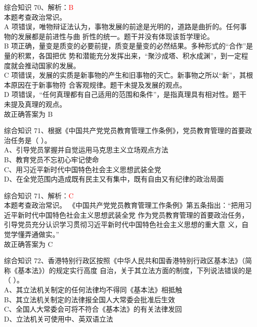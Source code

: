 \documentclass[aspectratio=169]{beamer}
\begin{document}
\begin{frame}[t]{综合知识}
    70、解析：\textcolor{red}{B}\\
    本题考查政治常识。\\
    A 项错误，唯物辩证法认为，事物发展的前途是光明的，道路是曲折的。任何事物的发展都是前进性与曲
    折性的统一。题干并没有体现该哲学理论。\\
    B 项正确，量变是质变的必要前提，质变是量变的必然结果。多种形式的“合作”是量的积累，各国把优
    势和潜能充分发挥出来，“聚沙成塔、积水成渊”，到一定程度就会推动国家的发展。\\
    C 项错误，发展的实质是新事物的产生和旧事物的灭亡。新事物之所以“新”，其根本原因在于新事物符
    合客观规律。题干未提及发展的观点。\\
    D 项错误，“任何真理都有自己适用的范围和条件”，是指真理具有相对性。题干未提及真理的观点。\\
    故正确答案为 B
\end{frame}                           


\begin{frame}[t]{综合知识}
    71、根据《中国共产党党员教育管理工作条例》，党员教育管理的首要政治任务是（ ）。  \\
    A、引导党员掌握并自觉运用马克思主义立场观点方法                                  \\
    B、教育党员不忘初心牢记使命                                                      \\
    C、用习近平新时代中国特色社会主义思想武装全党                                    \\
    D、在全党范围内造成既有民主又有集中，既有自由又有纪律的政治局面                  \\
\end{frame}                           

\begin{frame}[t]{综合知识}
    71、解析：\textcolor{red}{C}\\
    本题考查政治常识。
    《中国共产党党员教育管理工作条例》第五条指出：“把用习近平新时代中国特色社会主义思想武装全党
    作为党员教育管理的首要政治任务，引导党员充分认识学习贯彻习近平新时代中国特色社会主义思想的重大意
    义，自觉学懂弄通做实。”\\
    故正确答案为 C
\end{frame}                           



\begin{frame}[t]{综合知识}
    72、香港特别行政区按照《中华人民共和国香港特别行政区基本法》（简称《基本法》）的规定实行高度
    自治，关于其立法方面的制度，下列说法错误的是（ ）。   \\
    A、其立法机关制定的任何法律均不得同《基本法》相抵触   \\
    B、其立法机关制定的法律报全国人大常委会批准后生效     \\
    C、全国人大常委会可将不符合《基本法》的有关法律发回   \\
    D、立法机关可使用中、英双语立法                       \\
\end{frame}                           
\end{document}
